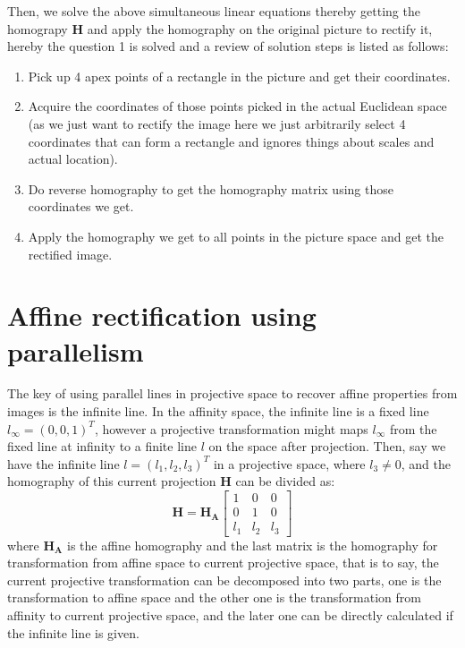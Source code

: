 \documentclass[conference]{IEEEtran}
\newcommand{\mat}[1]{\mathbf{#1}} %
\begin{document}
\noindent Then, we solve the above simultaneous linear equations thereby getting the homograpy $\mat{H}$ and apply the homography on the original picture to rectify it, hereby the question 1 is solved and a review of solution steps is listed as follows:
\begin{enumerate}
	\item Pick up 4 apex points of a rectangle in the picture and get their coordinates.
	\item Acquire the coordinates of those points picked in the actual Euclidean space (as we just want to rectify the image here we just arbitrarily select 4 coordinates that can form a rectangle and ignores things about scales and actual location).
	\item Do reverse homography to get the homography matrix using those coordinates we get.
	\item Apply the homography we get to all points in the picture space and get the rectified image.
\end{enumerate}


\section{Affine rectification using parallelism}
The key of using parallel lines in projective space to recover affine properties from images is the infinite line. In the affinity space, the infinite line is a fixed line $l_{\infty} = (0, 0, 1)^T$, however a projective transformation might maps $l_{\infty}$ from the fixed line at infinity to a finite line $l$ on the space after projection. Then, say we have the infinite line $l = (l_1, l_2, l_3)^T$ in a projective space, where $l_3\neq 0$, and the homography of this current projection $\mat{H}$ can be divided as:
\begin{equation}
	\mat{H}=\mat{H_A}
	\begin{bmatrix}
		1 & 0 & 0 \\
		0 & 1 & 0 \\
		l_1 &  l_2 & l_3
	\end{bmatrix}
\end{equation}
\noindent where $\mat{H_A}$ is the affine homography and the last matrix is the homography for transformation from affine space to current projective space, that is to say, the current projective transformation can be decomposed into two parts, one is the transformation to affine space and the other one is the transformation from affinity to current projective space, and the later one can be directly calculated if the infinite line is given.
\end{document}
